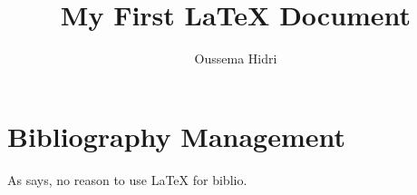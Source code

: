 \documentclass{article}
\author{Oussema Hidri}
\title{My First {\LaTeX} Document}
\date{}
\begin{document}
\maketitle

\section{Bibliography Management}

As \textcite{firstTag} says, no reason to use \LaTeX{} for biblio.

\printbibliography
\end{document}
